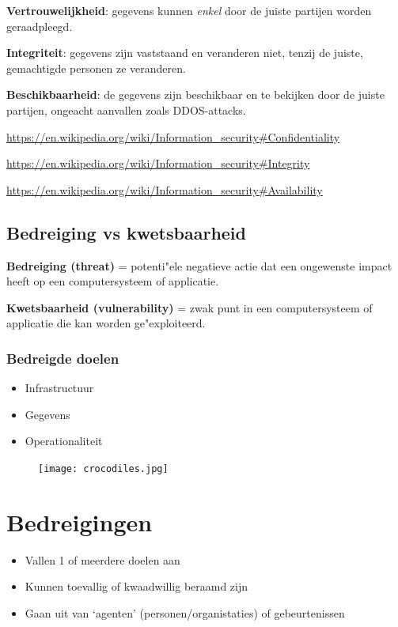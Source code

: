 \documentclass{article}
\newcommand{\bold}[1]{\textbf{#1}}
\begin{document}
\bold{Vertrouwelijkheid}: gegevens kunnen \textit{enkel} door de juiste partijen worden geraadpleegd.

\bold{Integriteit}: gegevens zijn vaststaand en veranderen niet, tenzij de juiste, gemachtigde personen ze veranderen.

\bold{Beschikbaarheid}: de gegevens zijn beschikbaar en te bekijken door de juiste partijen, ongeacht aanvallen zoals DDOS-attacks.

\url{https://en.wikipedia.org/wiki/Information_security#Confidentiality}

\url{https://en.wikipedia.org/wiki/Information_security#Integrity}

\url{https://en.wikipedia.org/wiki/Information_security#Availability}

\subsection{Bedreiging vs kwetsbaarheid}
\bold{Bedreiging (threat)} = potenti"ele negatieve actie dat een ongewenste impact heeft op een computersysteem of applicatie.

\bold{Kwetsbaarheid (vulnerability)} = zwak punt in een computersysteem of applicatie die kan worden ge"exploiteerd. 

\subsubsection{Bedreigde doelen}
\begin{itemize}
    \item Infrastructuur
    \item Gegevens
    \item Operationaliteit
\end{itemize}

\begin{figure}[H]
    \centering
    \texttt{[image: crocodiles.jpg]}
    \caption{}
\end{figure}

\section{Bedreigingen}

\begin{itemize}
    \item Vallen 1 of meerdere doelen aan
    \item Kunnen toevallig of kwaadwillig beraamd zijn
    \item Gaan uit van `agenten' (personen/organistaties) of gebeurtenissen
\end{itemize}
\end{document}
